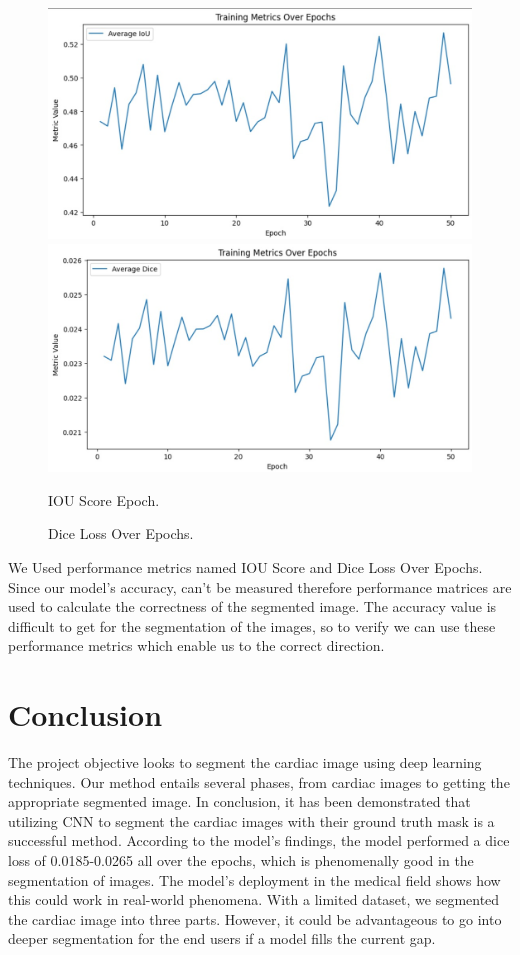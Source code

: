 \documentclass[runningheads]{llncs}
\begin{document}
\begin{figure}[h]
    \centering
    \includegraphics[scale=0.2]{iou.jpeg}
    \includegraphics[scale=0.2]{dice_train.jpg}
    \caption{IOU Score Epoch.}
    \label{fig:res}
    \caption{Dice Loss Over Epochs.}
    \label{fig:res}
\end{figure}
We Used performance metrics named IOU Score and Dice Loss Over Epochs. Since our model’s accuracy, can’t be measured therefore performance matrices are used to calculate the correctness of the segmented image. The accuracy value is difficult to get for the segmentation of the images, so to verify we can use these performance metrics which enable us to the correct direction.

\section{Conclusion}
\label{con}
The project objective looks to segment the cardiac image using deep learning techniques. Our method entails several phases, from cardiac images to getting the appropriate segmented image. In conclusion, it has been demonstrated that utilizing CNN to segment the cardiac images with their ground truth mask is a successful method. According to the model’s findings, the model performed a dice loss of 0.0185-0.0265 all over the epochs, which is phenomenally good in the segmentation of images. The model’s deployment in the medical field shows how this could work in real-world phenomena. With a limited dataset, we segmented the cardiac image into three parts. However, it could be advantageous to go into deeper segmentation for the end users if a model fills the current gap.


\cite{re1,re2,re3,re4,re5,re6,re7,re8,re9,re10,re11,re12,re13,re14,re15,re16,re18,re17,re19}


\end{document}
